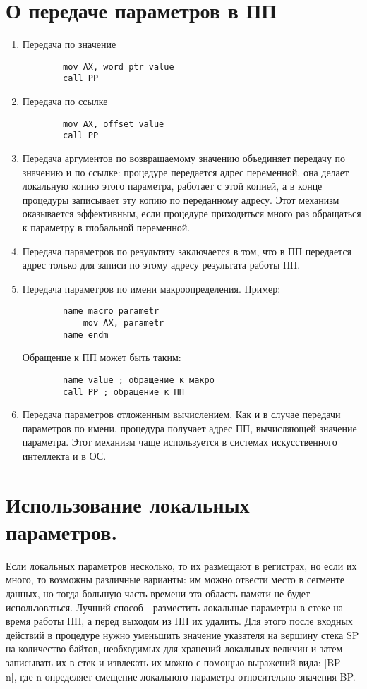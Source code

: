 \section{О передаче параметров в ПП}
\begin{enumerate}
    \item Передача по значение 
    \begin{verbatim}
        mov AX, word ptr value
        call PP
    \end{verbatim}
    \item Передача по ссылке
    \begin{verbatim}
        mov AX, offset value
        call PP
    \end{verbatim}
    \item Передача аргументов по возвращаемому значению объединяет передачу по значению и по ссылке: процедуре передается адрес переменной, она делает локальную копию этого параметра, работает с этой копией, а в конце процедуры записывает эту копию по переданному адресу. Этот механизм оказывается эффективным, если процедуре приходиться много раз обращаться к параметру в глобальной переменной.
    \item Передача параметров по результату заключается в том, что в ПП передается адрес только для записи по этому адресу результата работы ПП.
    \item Передача параметров по имени макроопределения. Пример:
    \begin{verbatim}
        name macro parametr
            mov AX, parametr
        name endm
    \end{verbatim}
    Обращение к ПП может быть таким:
    \begin{verbatim}
        name value ; обращение к макро
        call PP ; обращение к ПП
    \end{verbatim}
    \item Передача параметров отложенным вычислением. Как и в случае передачи параметров по имени, процедура получает адрес ПП, вычисляющей значение параметра. Этот механизм чаще используется в системах искусственного интеллекта и в ОС.
\end{enumerate}

\section{Использование локальных параметров.}

Если локальных параметров несколько, то их размещают в регистрах, но если их много, то возможны различные варианты: им можно отвести место в сегменте данных, но тогда большую часть времени эта область памяти не будет использоваться.
Лучший способ - разместить локальные параметры в стеке на время работы ПП, а перед выходом из ПП их удалить. Для этого после входных действий в процедуре нужно уменьшить значение указателя на вершину стека SP на количество байтов, необходимых для хранений локальных величин и затем записывать их в стек и извлекать их можно с помощью выражений вида: [BP - n], где n определяет смещение локального параметра относительно значения BP.

